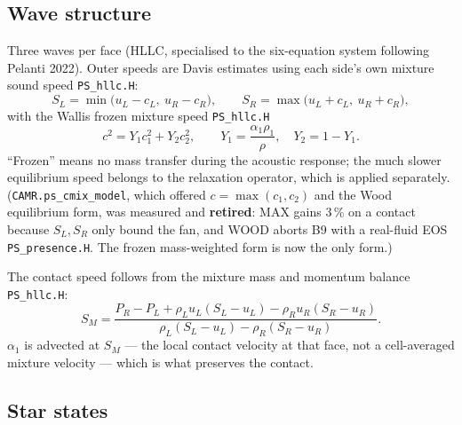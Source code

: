 \documentclass[11pt,a4paper]{article}
\newcommand{\code}[1]{\texttt{\small #1}}
\newcommand{\src}[1]{{\color{gray}\code{#1}}}
\begin{document}
\subsection{Wave structure}

Three waves per face (HLLC, specialised to the six-equation system following
Pelanti 2022).  Outer speeds are Davis estimates using each side's own mixture
sound speed \src{PS\_hllc.H}:
\begin{equation}
  S_L = \min\!\bigl(u_L-c_L,\ u_R-c_R\bigr),
  \qquad
  S_R = \max\!\bigl(u_L+c_L,\ u_R+c_R\bigr),
\end{equation}
with the Wallis frozen mixture speed \src{PS\_hllc.H}
\begin{equation}
  c^2 = Y_1c_1^2 + Y_2c_2^2,
  \qquad
  Y_1 = \frac{\alpha_1\rho_1}{\rho},\quad Y_2 = 1-Y_1 .
  \label{eq:cmix}
\end{equation}
``Frozen'' means no mass transfer during the acoustic response; the much
slower equilibrium speed belongs to the relaxation operator, which is applied
separately.  (\code{CAMR.ps\_cmix\_model}, which offered $c=\max(c_1,c_2)$
and the Wood equilibrium form, was measured and \textbf{retired}: MAX gains 3\,\% on a contact because $S_L,S_R$ only bound the
fan, and WOOD aborts B9 with a real-fluid EOS
\src{PS\_presence.H}.  The frozen mass-weighted form is now the
only form.)

The contact speed follows from the mixture mass and momentum balance
\src{PS\_hllc.H}:
\begin{equation}
  S_M = \frac{P_R-P_L + \rho_Lu_L(S_L-u_L) - \rho_Ru_R(S_R-u_R)}
             {\rho_L(S_L-u_L) - \rho_R(S_R-u_R)} .
\end{equation}
$\alpha_1$ is advected at $S_M$ --- the local contact velocity at that face,
not a cell-averaged mixture velocity --- which is what preserves the contact.

\subsection{Star states}
\label{sec:star}
\end{document}
